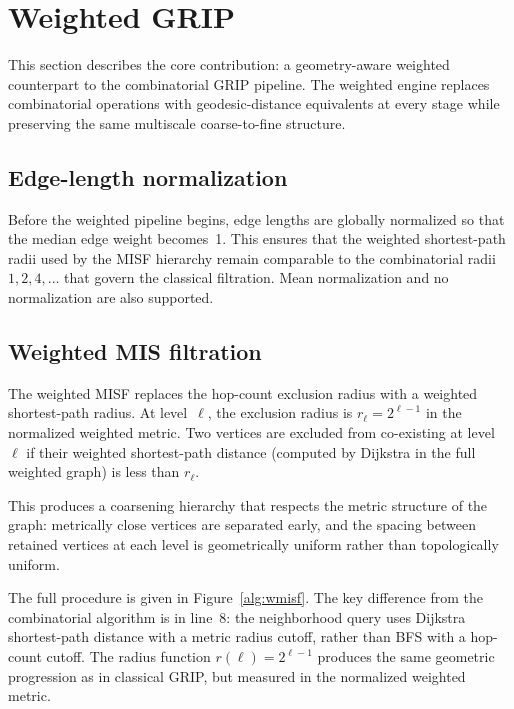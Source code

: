 \documentclass[11pt,twocolumn]{article}
\begin{document}
\section{Weighted GRIP}\label{sec:weighted}

This section describes the core contribution: a geometry-aware weighted
counterpart to the combinatorial GRIP pipeline.  The weighted engine
replaces combinatorial operations with geodesic-distance equivalents at
every stage while preserving the same multiscale coarse-to-fine
structure.

\subsection{Edge-length normalization}\label{sec:normalization}

Before the weighted pipeline begins, edge lengths are globally normalized
so that the median edge weight becomes~1.  This ensures that the
weighted shortest-path radii used by the MISF hierarchy remain comparable
to the combinatorial radii $1, 2, 4, \ldots$ that govern the classical
filtration.  Mean normalization and no normalization are also supported.

\subsection{Weighted MIS filtration}\label{sec:wmisf}

The weighted MISF replaces the hop-count exclusion radius with a
weighted shortest-path radius.  At level~$\ell$, the exclusion radius is
$r_\ell = 2^{\ell-1}$ in the normalized weighted metric.  Two vertices
are excluded from co-existing at level~$\ell$ if their weighted
shortest-path distance (computed by Dijkstra in the full weighted graph)
is less than $r_\ell$.

This produces a coarsening hierarchy that respects the metric structure
of the graph: metrically close vertices are separated early, and the
spacing between retained vertices at each level is geometrically uniform
rather than topologically uniform.

The full procedure is given in Figure~\ref{alg:wmisf}.  The key
difference from the combinatorial algorithm is in line~8: the
neighborhood query uses Dijkstra shortest-path distance with a metric
radius cutoff, rather than BFS with a hop-count cutoff.  The radius
function $r(\ell) = 2^{\ell-1}$ produces the same geometric progression
as in classical GRIP, but measured in the normalized weighted metric.
\end{document}
